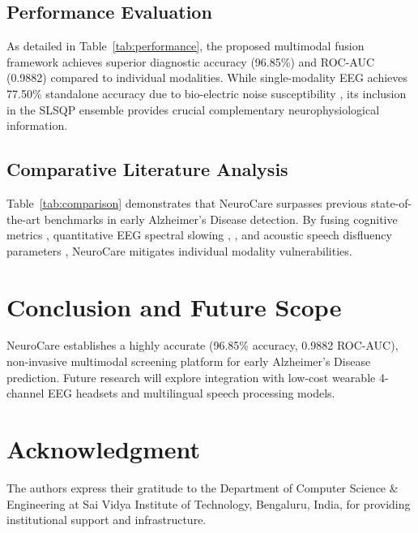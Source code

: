 \documentclass[conference]{IEEEtran}
\begin{document}
\subsection{Performance Evaluation}
As detailed in Table~\ref{tab:performance}, the proposed multimodal fusion framework achieves superior diagnostic accuracy (96.85\%) and ROC-AUC (0.9882) compared to individual modalities. While single-modality EEG achieves 77.50\% standalone accuracy due to bio-electric noise susceptibility \cite{cassani2018}, its inclusion in the SLSQP ensemble provides crucial complementary neurophysiological information.

\subsection{Comparative Literature Analysis}
Table~\ref{tab:comparison} demonstrates that NeuroCare surpasses previous state-of-the-art benchmarks in early Alzheimer's Disease detection. By fusing cognitive metrics \cite{marcus2007}, quantitative EEG spectral slowing \cite{jeong2004}, \cite{gu2021}, and acoustic speech disfluency parameters \cite{cummins2020}, NeuroCare mitigates individual modality vulnerabilities.

\section{Conclusion and Future Scope}
NeuroCare establishes a highly accurate (96.85\% accuracy, 0.9882 ROC-AUC), non-invasive multimodal screening platform for early Alzheimer's Disease prediction. Future research will explore integration with low-cost wearable 4-channel EEG headsets and multilingual speech processing models.

\section*{Acknowledgment}
The authors express their gratitude to the Department of Computer Science \& Engineering at Sai Vidya Institute of Technology, Bengaluru, India, for providing institutional support and infrastructure.
\end{document}
